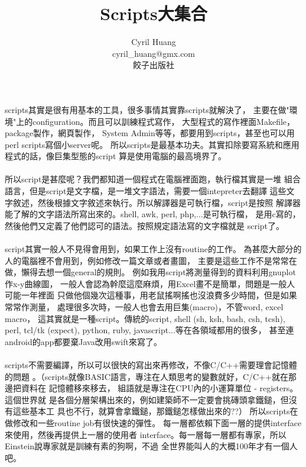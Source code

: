 \documentclass[a4paper,10pt,twoside]{book}
\title{Scripts大集合}
\author{
  Cyril Huang \\
  cyril\_huang@gmx.com \\
  餃子出版社
}
\begin{document}
  \maketitle
  \thispagestyle{empty}
  \tableofcontents
  \newpage

    scripts其實是很有用基本的工具，很多事情其實靠scripts就解決了，
    主要在做"環境"上的configuration。而且可以訓練程式寫作，
    大型程式的寫作裡面Makefile，package製作，網頁製作，
    System Admin等等，都要用到scripts，甚至也可以用perl scripts寫個小server呢。
    所以scripts是最基本功夫。其實扣除要寫系統和應用程式的話，像巨集型態的script
    算是使用電腦的最高境界了。
    \\\\
    所以script是甚麼呢？我們都知道一個程式在電腦裡面跑，執行檔其實是一堆
    組合語言，但是script是文字檔，是一堆文字語法，需要一個intepreter去翻譯
    這些文字敘述，然後根據文字敘述來執行。所以解譯器是可執行檔，script是按照
    解譯器能了解的文字語法所寫出來的。shell, awk, perl, php,...是可執行檔，
    是用c寫的，然後他們又定義了他們認可的語法。按照規定語法寫的文字檔就是
    script了。
    \\\\
    script其實一般人不見得會用到，如果工作上沒有routine的工作。
    為甚麼大部分的人的電腦裡不會用到，例如修改一篇文章或者畫圖，
    主要是這些工作不是常常在做，懶得去想一個general的規則。
    例如我用script將測量得到的資料利用gnuplot作x-y曲線圖，
    一般人會認為幹麼這麼麻煩，用Excel畫不是簡單，問題是一般人可能一年裡面
    只做他個幾次這種事，用老鼠搖啊搖也沒浪費多少時間，但是如果常常作測量，
    處理很多次時，一般人也會去用巨集(macro)，不管word, excel macro，
    這其實就是一種script。傳統的script, shell (sh, ksh, bash, csh, tcsh),
    perl, tcl/tk (expect), python, ruby, javascript...等在各領域都用的很多，
    甚至連android的app都要棄Java改用swift來寫了。
    \\\\
    scripts不需要編譯，所以可以很快的寫出來再修改，不像C/C++需要理會記憶體的問題
    。（scripts就像BASIC語言，專注在人類思考的變數就好，C/C++就在那邊把資料在
    記憶體移來移去， 組語就是專注在CPU內的小運算單位 - registers。這個世界就
    是各個分層架構出來的，例如建築師不一定要會挑磚頭拿鐵鎚，但沒有這些基本工
    具也不行，就算會拿鐵鎚，那鐵鎚怎樣做出來的??）
    所以scripts在做修改和一些routine job有很快速的彈性。
    每一層都依賴下面一層的提供interface來使用，然後再提供上一層的使用者
    interface。每一層每一層都有專家，所以Einstein說專家就是訓練有素的狗啊，不過
    全世界能叫人的大概100年才有一個人吧。









\end{document}
